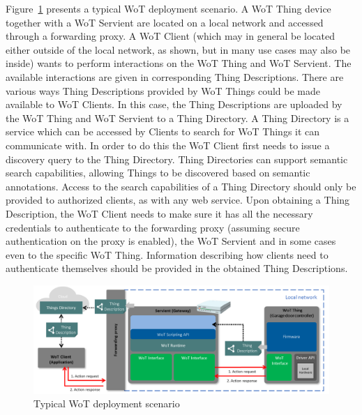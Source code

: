 Figure~\ref{fig-wot-scenario} presents a typical WoT deployment scenario. 
A WoT Thing device together with a WoT Servient are located on a 
local network and accessed through a forwarding proxy. 
A WoT Client (which may in general be located either outside of the local network,
as shown, but in many use cases may also be inside) wants to 
perform interactions on the WoT Thing and WoT Servient.
The available interactions are given in corresponding Thing Descriptions.
There are various ways Thing Descriptions provided by WoT Things
could be made available to WoT Clients.
In this case, the Thing Descriptions are 
uploaded by the WoT Thing and WoT Servient to a Thing Directory.
A Thing Directory is a service which can be accessed by Clients
to search for WoT Things it can communicate with.
In order to do this the WoT Client first needs to issue a 
discovery query to the Thing Directory.
Thing Directories can support semantic search capabilities, allowing
Things to be discovered based on semantic annotations. 
Access to the search capabilities of a Thing Directory should
only be provided to authorized clients, as with any web service.
Upon obtaining a Thing Description, 
the WoT Client needs to make sure it has all the necessary credentials
to authenticate to the forwarding proxy 
(assuming secure authentication on the proxy is enabled), 
the WoT Servient and in some cases even to the specific WoT Thing.
Information describing how clients need to authenticate themselves
should be provided in the obtained Thing Descriptions.  

\begin{figure}[!t]
\centering
\includegraphics[width=6in]{figures/wot-scenario.png}
\caption{Typical WoT deployment scenario}
\label{fig-wot-scenario}
\end{figure}
